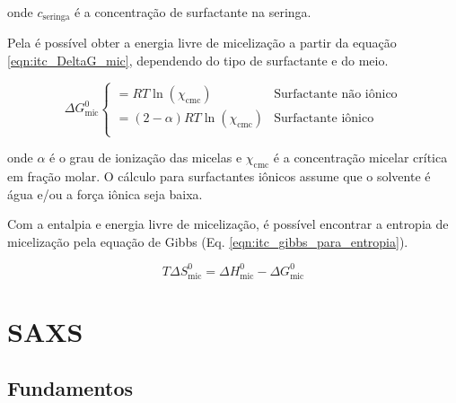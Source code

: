 		\noindent onde \(c_{\textrm{seringa}}\) é a concentração de surfactante na seringa.
		
		Pela \cmc{} é possível obter a energia livre de micelização a partir da equação \ref{eqn:itc_DeltaG_mic}, dependendo do tipo de surfactante e do meio.
		
		\begin{equation}
			\Delta G_{\textrm{mic}}^0
			\begin{cases}
			= RT\ln(\chi_{\textrm{cmc}})      & \textrm{Surfactante não iônico}      \\
			= (2-\alpha)RT\ln(\chi_{\textrm{cmc}}) & \textrm{Surfactante iônico}					\\
			\end{cases}
			\label{eqn:itc_DeltaG_mic}
		\end{equation}
		
		\noindent onde \(\alpha\) é o grau de ionização das micelas e \(\chi_{\textrm{cmc}}\) é a concentração micelar crítica em fração molar. O cálculo para surfactantes iônicos assume que o solvente é água e/ou a força iônica seja baixa.
		
		Com a entalpia e energia livre de micelização, é possível encontrar a entropia de micelização pela equação de Gibbs (Eq. \ref{eqn:itc_gibbs_para_entropia}).
		
		\begin{equation}
			T\Delta S^0_{\textrm{mic}} = \Delta H^0_{\textrm{mic}} - \Delta G^0_{\textrm{mic}}
			\label{eqn:itc_gibbs_para_entropia}
		\end{equation}


	\chapter{SAXS}
		\section{Fundamentos}
		
		
